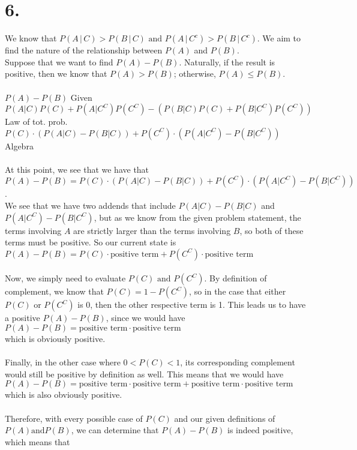 \documentclass{article}
\begin{document}
\section*{6.}
{\Large 

We know that $P(A\,\vert\, C) > P(B\,\vert\, C) \text{ and }  P(A\,\vert\, C^c) > P(B\,\vert\, C^c)$. We aim to find the nature of the relationship between $P(A)$ and $P(B)$. \\
Suppose that we want to find $P(A) - P(B)$. Naturally, if the result is positive, then we know that $P(A) > P(B)$; otherwise, $P(A) \leq P(B)$. \\ \\
$P(A) - P(B)$ \hfill Given\\
$P(A \vert C)P(C) + P(A \vert C^C)P(C^C) - (P(B \vert C)P(C) + P(B \vert C^C)P(C^C))$ Law of tot. prob.\\
$P(C) \cdot (P(A \vert C) - P(B \vert C)) + P(C^C) \cdot (P(A \vert C^C) - P(B \vert C^C))$ \hfill Algebra\\ \\ 
At this point, we see that we have that \\
$P(A) - P(B) = P(C) \cdot (P(A \vert C) - P(B \vert C)) + P(C^C) \cdot (P(A \vert C^C) - P(B \vert C^C))$. \\ 
We see that we have two addends that include $P(A \vert C) - P(B \vert C)$ and $P(A \vert C^C) - P(B \vert C^C)$, but as we know from the given problem statement, the terms involving $A$ are strictly larger than the terms involving $B$, so both of these terms must be positive. So our current state is \\
$P(A) - P(B) = P(C) \cdot \text{positive term} + P(C^C) \cdot \text{positive term}$ \\ \\ 
Now, we simply need to evaluate $P(C) \text{ and } P(C^C)$. By definition of complement, we know that $P(C) = 1 - P(C^C)$, so in the case that either $P(C) \text{ or } P(C^C)$ is 0, then the other respective term is 1. This leads us to have a positive $P(A) - P(B)$, since we would have \\ 
$P(A) - P(B) = \text{positive term} \cdot \text{positive term}$ \\
which is obviously positive. \\ \\
Finally, in the other case where $0 < P(C) < 1$, its corresponding complement would still be positive by definition as well. This means that we would have \\
$P(A) - P(B) = \text{positive term} \cdot \text{positive term} + \text{positive term} \cdot \text{positive term}$ \\
which is also obviously positive. \\ \\
Therefore, with every possible case of $P(C)$ and our given definitions of $P(A) \text{and} P(B)$, we can determine that $P(A) - P(B)$ is indeed positive, which means that 

}
\end{document}
